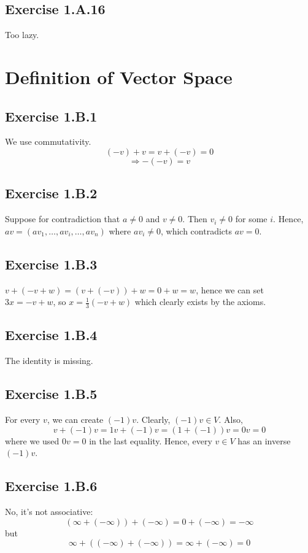 \documentclass{book}
\begin{document}
\subsection*{Exercise 1.A.16}
Too lazy.

\section{Definition of Vector Space}

\subsection*{Exercise 1.B.1}
We use commutativity.
$$(-v) + v = v + (-v) = 0$$
$$\Rightarrow -(-v) = v$$

\subsection*{Exercise 1.B.2}
Suppose for contradiction that $a \neq 0$ and $v \neq 0$. Then $v_i \neq 0$ for some $i$. Hence, $av = (av_1, \ldots, av_i, \ldots, av_n)$ where $av_i \neq 0$, which contradicts $av = 0$.

\subsection*{Exercise 1.B.3}
$v + (-v + w) = (v + (-v)) + w = 0 + w = w$, hence we can set $3x = -v + w$, so $x = \frac{1}{3}(-v + w)$ which clearly exists by the axioms.

\subsection*{Exercise 1.B.4}
The identity is missing.

\subsection*{Exercise 1.B.5}
For every $v$, we can create $(-1)v$. Clearly, $(-1)v \in V$. Also,
$$v + (-1)v = 1v + (-1)v = (1 + (-1))v = 0v = 0$$
where we used $0v = 0$ in the last equality. Hence, every $v \in V$ has an inverse $(-1)v$.

\subsection*{Exercise 1.B.6}
No, it's not associative:
$$(\infty + (-\infty)) + (-\infty) = 0 + (-\infty) = -\infty$$
but
$$\infty + ((-\infty) + (-\infty)) = \infty + (-\infty) = 0$$
\end{document}
